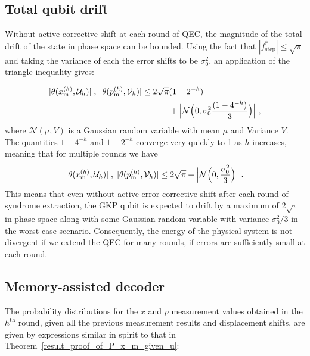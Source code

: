 \documentclass[prx,reprint,superscriptaddress,longbibliography,floatfix,nofootinbib]{revtex4-1}
\begin{document}
\subsection{Total qubit drift}
\noindent Without active corrective shift at each round of QEC, the magnitude of the total drift of the state in phase space can be bounded.
Using the fact that $|f_\text{step}^{*}| \leq \sqrt{\pi}$ and taking the variance of each the error shifts to be $\sigma_0^2$, an application of the triangle inequality gives:

\begin{equation}
\begin{split}
    |\theta(x_\text{m}^{(h)},\mathcal{U}_h)| \hspace{0.1cm} , \hspace{0.1cm} |\theta(p_\text{m}^{(h)},\mathcal{V}_h)| \leq 2\sqrt{\pi} & (1-2^{-h}) \\ & + \Big|\mathcal{N}\Big(0,\sigma_0^2\frac{(1-4^{-h})}{3}\Big)\Big| \ , 
    \end{split}
\end{equation}
\noindent where $\mathcal{N}(\mu,V)$ is a Gaussian random variable with mean $\mu$ and Variance $V$. 
The quantities $1-4^{-h}$ and $1-2^{-h}$ converge very quickly to 1 as $h$ increases, meaning that for multiple rounds we have
%
\begin{equation}
    |\theta(x_\text{m}^{(h)},\mathcal{U}_h)| \hspace{0.1cm} , \hspace{0.1cm} |\theta(p_\text{m}^{(h)},\mathcal{V}_h)| \leq 2\sqrt{\pi} + \Big|\mathcal{N}\Big(0,\frac{\sigma_0^2}{3}\Big)\Big| \ .
\end{equation}
%
\noindent This means that even without active error corrective shift after each round of syndrome extraction, the GKP qubit is expected to drift by a maximum of $2\sqrt{\pi}$ in phase space along with some Gaussian random variable with variance $\sigma_0^2/3$ in the worst case scenario. 
Consequently, the energy of the physical system is not divergent if we extend the QEC for many rounds, if errors are sufficiently small at each round.

\subsection{Memory-assisted decoder}
\noindent The probability distributions for the $x$ and $p$ measurement values obtained in the $h^{\text{th}}$ round, given all the previous measurement results and displacement shifts, are given by expressions similar in spirit to that in Theorem~\ref{result_proof_of_P_x_m_given_u}:
\end{document}
